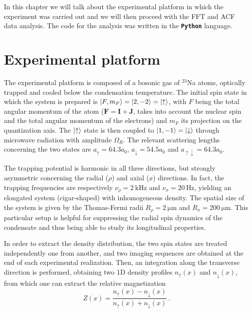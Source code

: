 In this chapter we will talk about the experimental platform in which the experiment was carried out and we will then proceed with the FFT and ACF data analysis. The code for the analysis was written in the \textbf{\texttt{Python}} language.

\section{Experimental platform}
The experimental platform is composed of a bosonic gas of $^{23}$Na atoms, optically trapped and cooled below the condensation temperature. The initial spin state in which the system is prepared is $\ket{F, m_F} = \ket{2, -2} = \ket{\uparrow}$, with $F$ being the total angular momentum of the atom ($\mathbf{F} = \mathbf{I} + \mathbf{J}$, takes into account the nuclear spin and the total angular momentum of the electrons) and $m_F$ its projection on the quantization axis. The $\ket{\uparrow}$ state is then coupled to $\ket{1, -1} = \ket{\downarrow}$ through microwave radiation with amplitude $\Omega_R$. The relevant scattering lengths concerning the two states are $a_\uparrow = 64.3 a_0$, $a_\downarrow = 54.5 a_0$ and $a_{\uparrow\downarrow} = 64.3 a_0$.

The trapping potential is harmonic in all three directions, but strongly asymmetric concerning the radial ($\rho$) and axial ($x$) directions. In fact, the trapping frequencies are respectively $\nu_\rho = 2\ \unit{\kilo\hertz}$ and $\nu_x = 20\ \unit{\hertz}$, yielding an elongated system (cigar-shaped) with inhomogeneous density. The spatial size of the system is given by the Thomas-Fermi radii $R_\rho = 2\ \unit{\micro\meter}$ and $R_x = 200\ \unit{\micro\meter}$. This particular setup is helpful for suppressing the radial spin dynamics of the condensate and thus being able to study its longitudinal properties.

In order to extract the density distribution, the two spin states are treated independently one from another, and two imaging sequences are obtained at the end of each experimental realization. Then, an integration along the transverse direction is performed, obtaining two 1D density profiles $n_\uparrow(x)$ and $n_\downarrow(x)$, from which one can extract the relative magnetization
\begin{equation}
    Z(x) = \frac{n_\uparrow(x) - n_\downarrow(x)}{n_\uparrow(x) + n_\downarrow(x)}\, .
    \label{eq:magnetization}
\end{equation}

